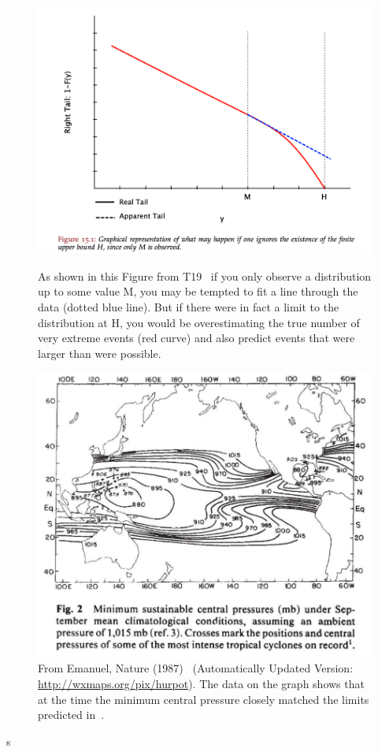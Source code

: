 \begin{figure}[htb!]
    \centering
    \includegraphics[width=1\linewidth]{images/nnt-upper-bound.png}
    \vspace{-15pt}
   \caption{As shown in this Figure from T19~\cite{taleb2019statistical} if you only
   observe a distribution up to some value M, you may be tempted to fit a line through the
   data (dotted blue line). But if there were in fact a limit to the distribution at H,
   you would be overestimating the true number of very extreme events (red curve) and also predict
   events that were larger than were possible.  }
   \label{fig:up-bound-taleb}
   \includegraphics[width=1\linewidth]{images/hurricane-Emanuel-upper-bound.png}
   \vspace{-15pt}
  \caption{From Emanuel, Nature (1987)~\cite{emanuel1987dependence}
  (Automatically Updated Version: \url{http://wxmaps.org/pix/hurpot}).
  The data on the graph shows that at the time the minimum central pressure
  closely matched the limits predicted in~\cite{emanuel1986air}. }
   \label{fig:emanuel87}

\end{figure}
s
